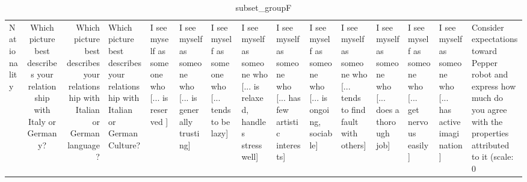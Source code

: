 \begin{table}
\caption{subset_groupF}
\label{tab:subset_groupF}
\begin{tabular}{lcr}
\toprule
Nationality & Which picture best describes your relationship with Italy or Germany? & Which picture best describes your relationship with Italian or German language? & Which picture best describes your relationship with Italian or German Culture? & I see myself as someone who  [... is reserved ] & I see myself as someone who  [... is generally trusting] & I see myself as someone who  [... tends to be lazy] & I see myself as someone who  [... is relaxed, handles stress well] & I see myself as someone who  [... has few artistic interests] & I see myself as someone who  [... is ongoing, sociable] & I see myself as someone who  [... tends to find fault with others] & I see myself as someone who  [... does a thorough job] & I see myself as someone who  [... get nervous easily] & I see myself as someone who  [... has active imagination] & Consider expectations toward Pepper robot and express how much do you agree with the properties attributed to it (scale: 0%
\end{tabular}
\end{table}
